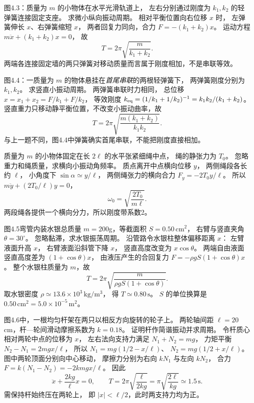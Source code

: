 图4.3：质量为 $m$ 的小物体在水平光滑轨道上，
左右分别通过刚度为 $k_1,k_2$ 的轻弹簧连接固定支座。
求微小纵向振动周期。
\exsolution
相对平衡位置向右位移 $x$ 时，
左弹簧伸长 $x$、右弹簧缩短 $x$，
两者回复力同向，合力
$F=-(k_1+k_2)x$。
运动方程
$m\ddot x+(k_1+k_2)x=0$，
故
\[
\boxed{T=2\pi\sqrt{\frac{m}{k_1+k_2}}}.
\]
\excheck 两端各连接固定墙的两只弹簧对移动质量而言属于刚度相加，不是串联等效。

图4.4：一质量为 $m$ 的物体悬挂在\emph{首尾串联}的两根轻弹簧下，
两弹簧刚度分别为 $k_1,k_2$。
求竖直小振动周期。
\exsolution
两弹簧串联时力相同，
总位移 $x=x_1+x_2=F/k_1+F/k_2$，
等效刚度
$k_{\rm eq}=(1/k_1+1/k_2)^{-1}
=k_1k_2/(k_1+k_2)$。
竖直重力只移动静平衡位置，不改变小振动曲率，故
\[
\boxed{T=2\pi\sqrt{\frac{m(k_1+k_2)}{k_1k_2}}}.
\]
\excheck 与上一题不同，图4.4中弹簧确实首尾串联，不能把刚度直接相加。

质量为 $m$ 的小物体固定在长 $2\ell$ 的水平张紧细绳中点，
绳的静张力为 $T_0$。
忽略重力和绳质量，求横向小振动角频率。
\exsolution
质点离开中点横向位移 $y$，
两侧绳段各长约 $\ell$，
小角度下
$\sin\alpha\simeq y/\ell$，
两侧绳张力的横向合力
$F_y=-2T_0y/\ell$。
所以
$m\ddot y+(2T_0/\ell)y=0$，
\[
\boxed{\omega_0=\sqrt{\frac{2T_0}{m\ell}}}.
\]
\excheck 两段绳各提供一个横向分力，所以刚度带系数2。

图4.5弯管内装水银总质量
$m=200$g，等截面积
$S=0.50\,\mathrm{cm^2}$，
右臂与竖直夹角
$\theta=30^\circ$。
忽略黏滞，求水银振荡周期。
\exsolution
沿管路令水银柱整体偏移距离 $x$：
左臂液面升高 $x$，
右臂液面沿斜管下降 $x$，
竖直高度改变为 $x\cos\theta$。
两端自由液面竖直高度差为
$(1+\cos\theta)x$，
由液压产生的合回复力
$F=-\rho gS(1+\cos\theta)x$。
整个水银柱质量为 $m$，故
\[
\boxed{T=2\pi
\sqrt{\frac{m}{\rho gS(1+\cos\theta)}}}.
\]
取水银密度 $\rho\simeq13.6\times10^3\,\mathrm{kg/m^3}$，
得
$\boxed{T\simeq0.80\,\mathrm s}$。
\excheck $S$ 的单位换算是
$0.50\,\mathrm{cm^2}=5.0\times10^{-5}\,\mathrm{m^2}$。

图4.6中，一根均匀杆架在两只以相反方向旋转的轮子上。
两轮轴间距 $\ell=20$cm，杆—轮间滑动摩擦系数为
$k=0.18$。
证明杆作简谐振动并求周期。
\exsolution
令杆质心相对两轮中点的位移为 $x$，
左右法向支持力满足
$N_1+N_2=mg$，
力矩平衡
$N_2-N_1=2mgx/\ell$，
所以
$N_1=mg(1/2-x/\ell)$、
$N_2=mg(1/2+x/\ell)$。
图中两轮顶面分别向中心移动，
摩擦力分别为右向 $kN_1$ 与左向 $kN_2$，
合力
$F=k(N_1-N_2)=-2kmgx/\ell$。
因此
\[
\ddot x+\frac{2kg}{\ell}x=0,
\qquad
\boxed{T=2\pi\sqrt{\frac{\ell}{2kg}}
=\pi\sqrt{\frac{2\ell}{kg}}
\simeq1.5\,\mathrm s}.
\]
\excheck 需保持杆始终压在两轮上，
即 $|x|<\ell/2$，此时两支持力均为正。

